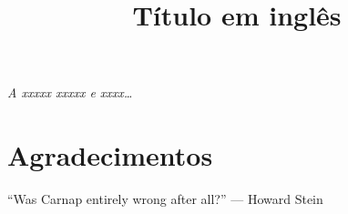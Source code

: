 \documentclass[diss]{UFSM}
\title{Título em inglês}
\begin{document}

\setlength{\baselineskip}{1.5\baselineskip}


\capa



\folharosto



\restoregeometry



\aprovacao



\clearpage
\begin{flushright}
\mbox{}\vfill
{\sffamily\itshape A xxxxx xxxxx e xxxx\ldots}
\end{flushright}



\chapter*{Agradecimentos}




\clearpage
\begin{flushright}
\mbox{}\vfill
``Was Carnap entirely wrong after all?'' --- Howard Stein
\end{flushright}


\end{document}
